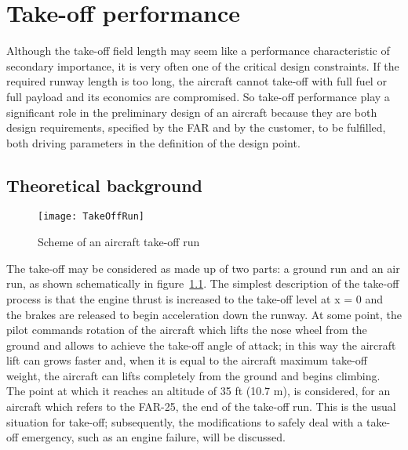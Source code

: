 \chapter{Take-off performance}
\label{chap:TakeOff}
Although the take-off field length may seem like a performance characteristic of secondary importance, it is very often one of the critical design constraints. If the required runway length is too long, the aircraft cannot take-off with full fuel or full payload and its economics are compromised.
%
So take-off performance play a significant role in the preliminary design of an aircraft because they are both design requirements, specified by the \gls{FAR} and by the customer, to be fulfilled, both driving parameters in the definition of the design point. 
%
\section{Theoretical background}
%
\begin{figure}[!b]
\centering
\texttt{[image: TakeOffRun]}
\caption{Scheme of an aircraft take-off run}
\label{fig:TOrun}
\end{figure}
%
The take-off may be considered as made up of two parts: a ground run and an air run, as shown schematically in figure~\ref{fig:TOrun}. The simplest description of the take-off process is that the engine thrust is increased to the take-off level at x = 0 and the brakes are released to begin acceleration down the runway. At some point, the pilot commands rotation of the aircraft which lifts the nose wheel from the ground and allows to achieve the take-off angle of attack; in this way the aircraft lift can grows faster and, when it is equal to the aircraft maximum take-off weight, the aircraft can lifts completely from the ground and begins climbing. The point at which it reaches an altitude of 35 \si{ft} (10.7 \si{\meter}), is considered, for an aircraft which refers to the \gls{FAR}-25, the end of the take-off run. 
%
This is the usual situation for take-off; subsequently, the modifications to safely deal with a take-off emergency, such as an engine failure, will be discussed.
%
